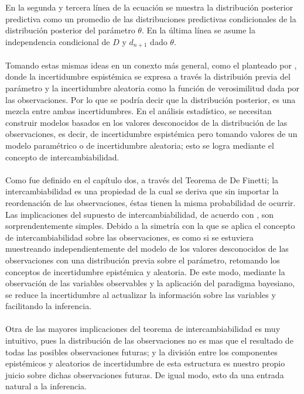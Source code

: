 En la segunda y tercera l\'inea de la ecuaci\'on se muestra la distribuci\'on posterior predictiva como un promedio de las distribuciones predictivas condicionales de la distribuci\'on posterior del par\'ametro $\theta$. En la \'ultima l\'inea se asume la independencia condicional de $D$ y $d_{n+1}$ dado $\theta$.\\
\\
Tomando estas mismas ideas en un conexto m\'as general, como el planteado por \cite{goldstein2013observables}, donde la incertidumbre espist\'emica se expresa a trav\'es la distribui\'on previa del par\'ametro y la incertidumbre aleatoria como la funci\'on de verosimilitud dada por las observaciones. Por lo que se podr\'ia decir que la distribuci\'on posterior, es una mezcla entre ambas incertidumbres. En el an\'alisis estad\'istico, se necesitan construir modelos basados en los valores desconocidos de la distribuci\'on de las observaciones, es decir, de incertidumbre espist\'emica pero tomando valores de un modelo param\'etrico o de incertidumbre aleatoria; esto se logra mediante el concepto de intercambiabilidad.\\
\\
Como fue definido en el cap\'itulo dos, a trav\'es del Teorema de De Finetti; la intercambiabilidad es una propiedad de la cual se deriva que sin importar la reordenaci\'on de las observaciones, \'estas tienen la misma probabilidad de ocurrir. Las implicaciones del supuesto de intercambiabilidad, de acuerdo con \cite{goldstein2013observables}, son sorprendentemente simples. Debido a la simetr\'ia con la que se aplica el concepto de intercambiabilidad sobre las observaciones, es como si se estuviera muestreando independientemente del modelo de los valores desconocidos de las observaciones con una distribuci\'on previa sobre el par\'ametro, retomando los conceptos de incertidumbre epist\'emica y aleatoria. De este modo, mediante la observaci\'on de las variables observables y la aplicaci\'on del paradigma bayesiano, se reduce la incertidumbre al actualizar la informaci\'on sobre las variables y facilitando la inferencia.\\
\\
Otra de las mayores implicaciones del teorema de intercambiabilidad es muy intuitivo, pues la distribuci\'on de las observaciones no es mas que el resultado de todas las posibles observaciones futuras; y la divisi\'on entre los componentes epist\'emicos y aleatorios de incertidumbre de esta estructura es nuestro propio juicio sobre dichas observaciones futuras. De igual modo, esto da una entrada natural a la inferencia.\\
